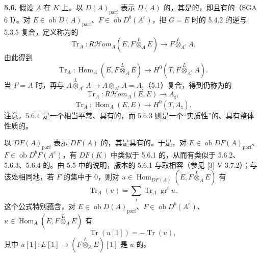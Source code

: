 \textbf{5.6.} 假设 $A$ 在 $K$ 上。以 $D(A)_{\mathrm{parf}}$ 表示 $D(A)$ 的，其是的，即且有的（SGA 6 I）。对 $E\in\operatorname{ob}D(A)_{\mathrm{parf}}$、$F\in\operatorname{ob}D^b(A^e)$，把 $G=E$ 时的 5.4.2 的逆与 5.3.5 复合，定义称为的
\begin{equation}\operatorname{Tr}_A:R\mathcal{H}\!om_A(E,F\overset L\otimes_A E)\longrightarrow F\overset L\otimes_{A^e}A.\tag{5.6.1}\end{equation}
由此得到
\begin{equation}\operatorname{Tr}_A:\operatorname{Hom}_A(E,F\overset L\otimes_A E)\longrightarrow H^0(T,F\overset L\otimes_{A^e}A).\tag{5.6.2}\end{equation}
当 $F=A$ 时，再与 $A\overset L\otimes_{A^e}A\to A\otimes_{A^e}A=A_\natural$（5.1）复合，得到仍称为的
\begin{equation}\operatorname{Tr}_A:R\mathcal{H}\!om_A(E,E)\longrightarrow A_\natural,\tag{5.6.3}\end{equation}
\begin{equation}\operatorname{Tr}_A:\operatorname{Hom}_A(E,E)\longrightarrow H^0(T,A_\natural).\tag{5.6.4}\end{equation}
注意，5.6.4 是一个相当平常、具有的，而 5.6.3 则是一个“实质性”的、具有整体性质的。

以 $DF(A)_{\mathrm{parf}}$ 表示 $DF(A)$ 的，其是具有的。于是，对 $E\in\operatorname{ob}DF(A)_{\mathrm{parf}}$、$F\in\operatorname{ob}D^bF(A^e)$，有 $DF(K)$ 中类似于 5.6.1 的，从而有类似于 5.6.2、5.6.3、5.6.4 的。由 5.5 中的说明，版本的 5.6.1 与取相容（参见 [3] V 3.7.2）；与该处相同地，若 $F$ 的集中于 $0$，则对 $u\in\operatorname{Hom}_{DF(A)}(E,F\overset L\otimes_A E)$ 有
\begin{equation}\operatorname{Tr}_A(u)=\sum_i\operatorname{Tr}_A\operatorname{gr}^i u.\tag{5.6.5}\end{equation}
这个公式特别蕴含，对 $E\in\operatorname{ob}D(A)_{\mathrm{parf}}$、$F\in\operatorname{ob}D^b(A^e)$、$u\in\operatorname{Hom}_A(E,F\overset L\otimes_A E)$ 有
\begin{equation}\operatorname{Tr}(u[1])=-\operatorname{Tr}(u),\tag{5.6.6}\end{equation}
其中 $u[1]:E[1]\to(F\overset L\otimes_A E)[1]$ 是 $u$ 的。

